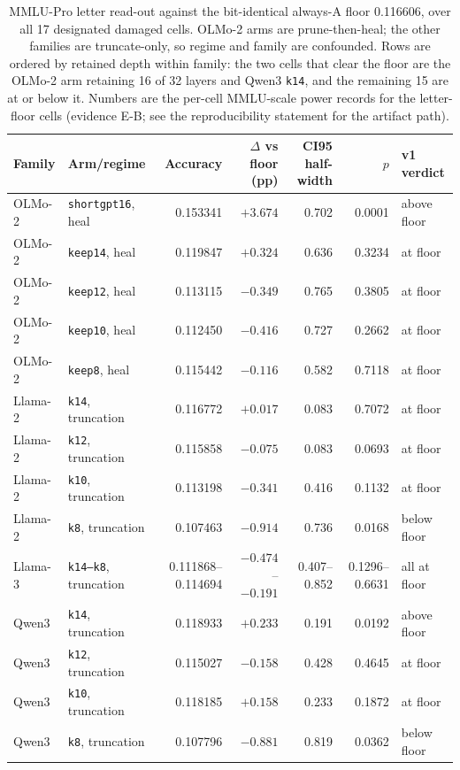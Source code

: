 \begin{table}[t]
\centering
\scriptsize
\setlength{\tabcolsep}{2.6pt}
\begin{tabular}{llrrrrl}
\toprule
Family & Arm/regime & Accuracy & $\Delta$ vs floor (pp) & CI95 half-width & $p$ & v1 verdict \\
\midrule
OLMo-2 & \texttt{shortgpt16}, heal & 0.153341 & $+3.674$ & 0.702 & 0.0001 & above floor \\
OLMo-2 & \texttt{keep14}, heal & 0.119847 & $+0.324$ & 0.636 & 0.3234 & at floor \\
OLMo-2 & \texttt{keep12}, heal & 0.113115 & $-0.349$ & 0.765 & 0.3805 & at floor \\
OLMo-2 & \texttt{keep10}, heal & 0.112450 & $-0.416$ & 0.727 & 0.2662 & at floor \\
OLMo-2 & \texttt{keep8}, heal & 0.115442 & $-0.116$ & 0.582 & 0.7118 & at floor \\
Llama-2 & \texttt{k14}, truncation & 0.116772 & $+0.017$ & 0.083 & 0.7072 & at floor \\
Llama-2 & \texttt{k12}, truncation & 0.115858 & $-0.075$ & 0.083 & 0.0693 & at floor \\
Llama-2 & \texttt{k10}, truncation & 0.113198 & $-0.341$ & 0.416 & 0.1132 & at floor \\
Llama-2 & \texttt{k8}, truncation & 0.107463 & $-0.914$ & 0.736 & 0.0168 & below floor \\
Llama-3 & \texttt{k14--k8}, truncation & 0.111868--0.114694 & $-0.474$--$-0.191$ & 0.407--0.852 & 0.1296--0.6631 & all at floor \\
Qwen3 & \texttt{k14}, truncation & 0.118933 & $+0.233$ & 0.191 & 0.0192 & above floor \\
Qwen3 & \texttt{k12}, truncation & 0.115027 & $-0.158$ & 0.428 & 0.4645 & at floor \\
Qwen3 & \texttt{k10}, truncation & 0.118185 & $+0.158$ & 0.233 & 0.1872 & at floor \\
Qwen3 & \texttt{k8}, truncation & 0.107796 & $-0.881$ & 0.819 & 0.0362 & below floor \\
\bottomrule
\end{tabular}
\caption{MMLU-Pro letter read-out against the bit-identical always-A floor 0.116606, over all 17 designated damaged cells. OLMo-2 arms are prune-then-heal; the other families are truncate-only, so regime and family are confounded. Rows are ordered by retained depth within family: the two cells that clear the floor are the OLMo-2 arm retaining 16 of 32 layers and Qwen3 \texttt{k14}, and the remaining 15 are at or below it. Numbers are the per-cell MMLU-scale power records for the letter-floor cells (evidence \textsf{E-B}; see the reproducibility statement for the artifact path).}
\label{tab:mmlupro}
\end{table}
